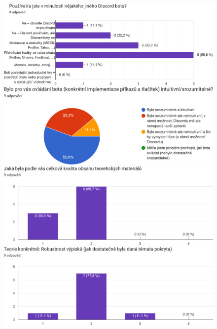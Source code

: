 \documentclass[FM]{tulthesis}
\begin{document}
	\begin{figure}[ht]
		\centering
		\includegraphics[width=\textwidth]{img/questionnaire/3}\bigskip\par
		\includegraphics[width=\textwidth]{img/questionnaire/4}\bigskip\par
		\includegraphics[width=\textwidth]{img/questionnaire/5}\bigskip\par
		\includegraphics[width=\textwidth]{img/questionnaire/6}\bigskip\par
	\end{figure}
\end{document}
